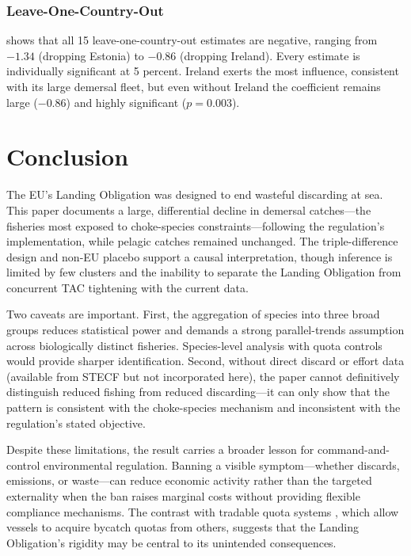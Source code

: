 \documentclass[12pt]{article}
\begin{document}
\subsubsection*{Leave-One-Country-Out}  shows that all 15 leave-one-country-out estimates are negative, ranging from $-1.34$ (dropping Estonia) to $-0.86$ (dropping Ireland). Every estimate is individually significant at 5 percent. Ireland exerts the most influence, consistent with its large demersal fleet, but even without Ireland the coefficient remains large ($-0.86$) and highly significant ($p = 0.003$).




\section{Conclusion}

The EU's Landing Obligation was designed to end wasteful discarding at sea. This paper documents a large, differential decline in demersal catches---the fisheries most exposed to choke-species constraints---following the regulation's implementation, while pelagic catches remained unchanged. The triple-difference design and non-EU placebo support a causal interpretation, though inference is limited by few clusters and the inability to separate the Landing Obligation from concurrent TAC tightening with the current data.

Two caveats are important. First, the aggregation of species into three broad groups reduces statistical power and demands a strong parallel-trends assumption across biologically distinct fisheries. Species-level analysis with quota controls would provide sharper identification. Second, without direct discard or effort data (available from STECF but not incorporated here), the paper cannot definitively distinguish reduced fishing from reduced discarding---it can only show that the pattern is consistent with the choke-species mechanism and inconsistent with the regulation's stated objective.

Despite these limitations, the result carries a broader lesson for command-and-control environmental regulation. Banning a visible symptom---whether discards, emissions, or waste---can reduce economic activity rather than the targeted externality when the ban raises marginal costs without providing flexible compliance mechanisms. The contrast with tradable quota systems \citep{costello2008can}, which allow vessels to acquire bycatch quotas from others, suggests that the Landing Obligation's rigidity may be central to its unintended consequences.
\end{document}

